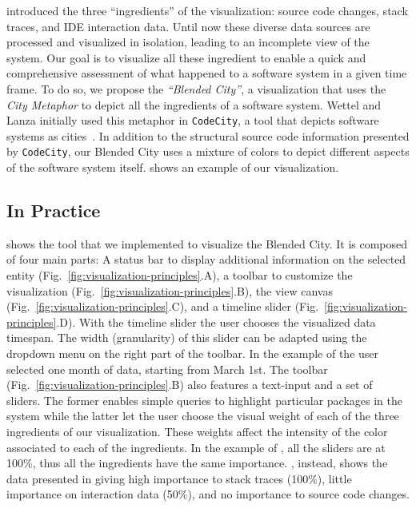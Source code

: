  introduced the three ``ingredients'' of the visualization: source code changes, stack traces, and IDE interaction data.
Until now these diverse data sources are processed and visualized in isolation, leading to an incomplete view of the system.
Our goal is to visualize all these ingredient to enable a quick and comprehensive assessment of what happened to a software system in a given time frame.
To do so, we propose the \emph{``Blended City''}, a visualization that uses the \emph{City Metaphor} to depict all the ingredients of a software system.
Wettel and Lanza initially used this metaphor in \texttt{CodeCity}, a tool that depicts software systems as cities~\cite{Wett2007}.
In addition to the structural source code information presented by \texttt{CodeCity}, our Blended City uses a mixture of colors to depict different aspects of the software system itself.
 shows an example of our visualization.

\subsection{In Practice}

 shows the tool that we implemented to visualize the Blended City.
It is composed of four main parts: A status bar to display additional information on the selected entity (Fig.~\ref{fig:visualization-principles}.A), a toolbar to customize the visualization (Fig.~\ref{fig:visualization-principles}.B), the view canvas (Fig.~\ref{fig:visualization-principles}.C), and a timeline slider (Fig.~\ref{fig:visualization-principles}.D).
With the timeline slider the user chooses the visualized data timespan.
The width (\ie granularity) of this slider can be adapted using the dropdown menu on the right part of the toolbar.
In the example of  the user selected one month of data, starting from March 1st.
 The toolbar (Fig.~\ref{fig:visualization-principles}.B) also features a text-input and a set of sliders.
The former enables simple queries to highlight particular packages in the system while the latter let the user choose the visual weight of each of the three ingredients of our visualization.
These weights affect the intensity of the color associated to each of the ingredients.
In the example of , all the sliders are at 100\%, thus all the ingredients have the same importance.
, instead, shows the data presented in  giving high importance to stack traces (100\%), little importance on interaction data (50\%), and no importance to source code changes.

